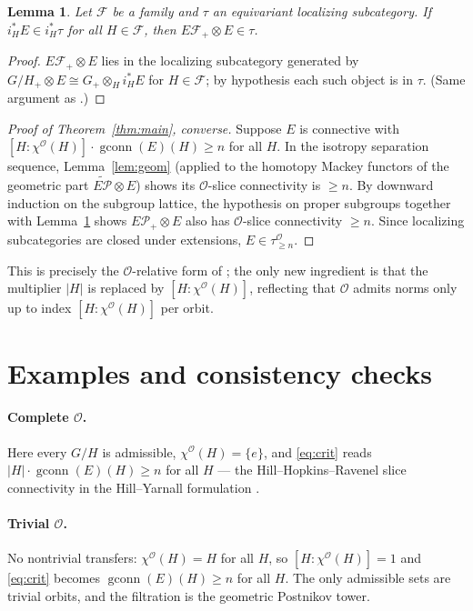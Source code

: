 \documentclass[11pt]{article}
\newcommand{\aO}{\mathcal{O}}
\newcommand{\gconn}{\operatorname{gconn}}
\newtheorem{lemma}{Lemma}
\theoremstyle{definition}
\begin{document}
\begin{lemma}\label{lem:induced}
Let $\mathcal F$ be a family and $\tau$ an equivariant localizing subcategory. If
$i_H^\ast E\in i_H^\ast\tau$ for all $H\in\mathcal F$, then $E\mathcal
F_+\otimes E\in\tau$.
\end{lemma}

\begin{proof}
$E\mathcal F_+\otimes E$ lies in the localizing subcategory generated by
$G/H_+\otimes E\cong G_+\otimes_H i_H^\ast E$ for $H\in\mathcal F$; by hypothesis
each such object is in $\tau$. (Same argument as \cite[Lem.~2.4]{HY18}.)
\end{proof}

\begin{proof}[Proof of Theorem~\ref{thm:main}, converse]
Suppose $E$ is connective with $[H:\chi^\aO(H)]\cdot\gconn(E)(H)\ge n$ for all
$H$. In the isotropy separation sequence, Lemma~\ref{lem:geom} (applied to the
homotopy Mackey functors of the geometric part $\widetilde{E\mathcal P}\otimes
E$) shows its $\aO$-slice connectivity is $\ge n$. By downward induction on the
subgroup lattice, the hypothesis on proper subgroups together with
Lemma~\ref{lem:induced} shows $E\mathcal P_+\otimes E$ also has $\aO$-slice
connectivity $\ge n$. Since localizing subcategories are closed under
extensions, $E\in\tau^\aO_{\ge n}$.
\end{proof}

This is precisely the $\aO$-relative form of \cite[Thm.~2.5]{HY18}; the only
new ingredient is that the multiplier $|H|$ is replaced by $[H:\chi^\aO(H)]$,
reflecting that $\aO$ admits norms only up to index $[H:\chi^\aO(H)]$ per orbit.

\section*{Examples and consistency checks}

\paragraph{Complete $\aO$.} Here every $G/H$ is admissible, $\chi^\aO(H)=\{e\}$,
and \eqref{eq:crit} reads $|H|\cdot\gconn(E)(H)\ge n$ for all $H$ --- the
Hill--Hopkins--Ravenel slice connectivity in the Hill--Yarnall formulation
\cite{HY18, HHR16}.

\paragraph{Trivial $\aO$.} No nontrivial transfers: $\chi^\aO(H)=H$ for all $H$,
so $[H:\chi^\aO(H)]=1$ and \eqref{eq:crit} becomes $\gconn(E)(H)\ge n$ for all
$H$. The only admissible sets are trivial orbits, and the filtration is the
geometric Postnikov tower.
\end{document}
